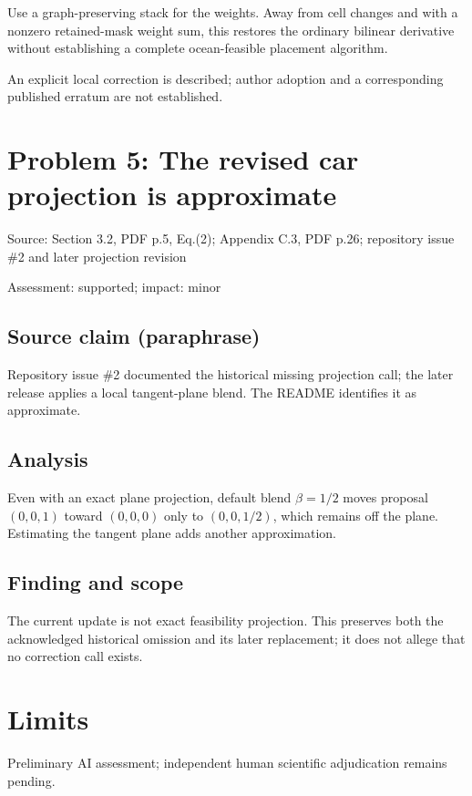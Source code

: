 \documentclass[11pt]{article}
\begin{document}
Use a graph-preserving stack for the weights. Away from cell changes and with a nonzero retained-mask weight sum, this restores the ordinary bilinear derivative without establishing a complete ocean-feasible placement algorithm.

An explicit local correction is described; author adoption and a corresponding published erratum are not established.

\section*{Problem 5: The revised car projection is approximate}

Source: Section 3.2, PDF p.5, Eq.(2); Appendix C.3, PDF p.26; repository issue \#2 and later projection revision

Assessment: supported; impact: minor

\subsection*{Source claim (paraphrase)}

Repository issue \#2 documented the historical missing projection call; the later release applies a local tangent-plane blend. The README identifies it as approximate.

\subsection*{Analysis}

Even with an exact plane projection, default blend \(\beta=1/2\) moves proposal \((0,0,1)\) toward \((0,0,0)\) only to \((0,0,1/2)\), which remains off the plane. Estimating the tangent plane adds another approximation.

\subsection*{Finding and scope}

The current update is not exact feasibility projection. This preserves both the acknowledged historical omission and its later replacement; it does not allege that no correction call exists.

\section*{Limits}

Preliminary AI assessment; independent human scientific adjudication remains pending.\par
\end{document}
